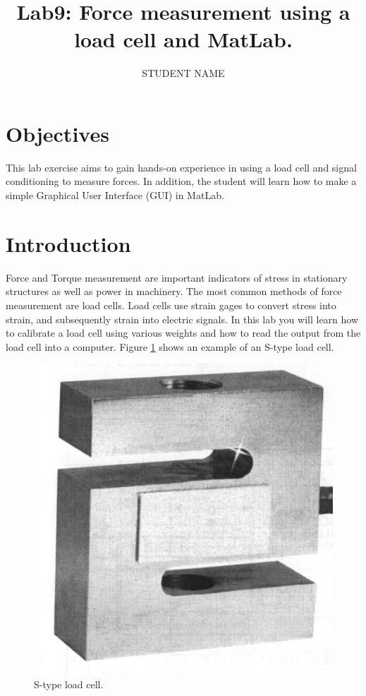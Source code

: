 \documentclass[12pt,letterpaper]{article}
\author{STUDENT NAME}
\title{Lab9: Force measurement using a load cell and MatLab.}
\begin{document}
\maketitle

\section{Objectives}

This lab exercise aims to gain hands-on experience in using a load cell and signal conditioning to measure forces. In addition, the student will learn how to make a simple Graphical User Interface (GUI) in MatLab.

\section{Introduction}
Force and Torque measurement are important indicators of stress in stationary structures as well as power in machinery. The most common methods of force measurement are load cells. Load cells use strain gages to convert stress into strain, and subsequently strain into electric signals. In this lab you will learn how to calibrate a load cell using various weights and how to read the output from the load cell into a computer. Figure \ref{fig:Lab9_S-typeLoadCell} shows an example of an S-type load cell.\\

\begin{figure}
\centering
\includegraphics[width=.5\linewidth]{Lab9_S-typeLoadCell}
\caption{S-type load cell.}
\label{fig:Lab9_S-typeLoadCell}
\end{figure}
\end{document}
